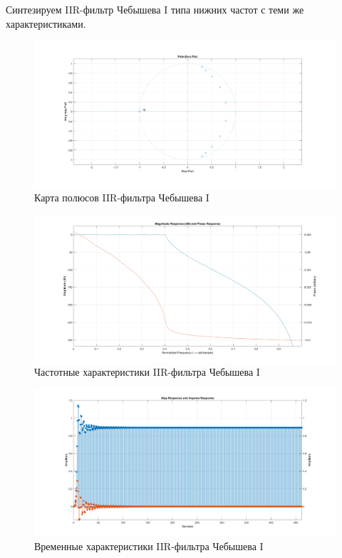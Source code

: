 \documentclass[12pt,a4paper]{article}
\begin{document}
	Синтезируем IIR-фильтр Чебышева I типа нижних частот с теми же характеристиками.
		
	\begin{figure}[H]
		\centering
		\includegraphics[width=1.0\linewidth]{res/5_cheb1_poles.png}
		\caption{Карта полюсов IIR-фильтра Чебышева I}
	\end{figure}
	
	\begin{figure}[H]
		\centering
		\includegraphics[width=1.0\linewidth]{res/5_cheb1_ach.png}
		\caption{Частотные характеристики IIR-фильтра Чебышева I}
	\end{figure}
	
	\begin{figure}[H]
		\centering
		\includegraphics[width=1.0\linewidth]{res/5_cheb1_time.png}
		\caption{Временные характеристики IIR-фильтра Чебышева I}
	\end{figure}
\end{document}

